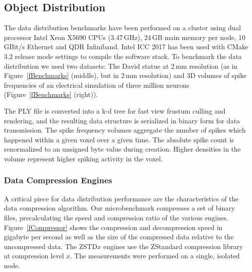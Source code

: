 \documentclass[10pt,journal,compsoc]{IEEEtran}
\newcommand{\fig}[1]{Figure~\ref{#1}}
\begin{document}
\subsection{Object Distribution}

The data distribution benchmarks have been performed on a cluster using dual
processor Intel Xeon X5690 CPUs (3.47\,GHz), 24\,GB main memory per node,
10\,GBit/s Ethernet and QDR Infiniband. Intel ICC 2017 has been used with CMake
3.2 release mode settings to compile the software stack. To benchmark the data
distribution we used two datasets: The David statue at 2\,mm resolution (as in
\fig{fBenchmarks} (middle), but in 2\,mm resolution) and 3D volumes of spike
frequencies of an electrical simulation of three million neurons
(\fig{fBenchmarks} (right)).

The PLY file is converted into a k-d tree for fast view frustum culling and
rendering, and the resulting data structure is serialized in binary form for
data transmission. The spike frequency volumes aggregate the number of spikes
which happened within a given voxel over a given time. The absolute spike count
is renormalized to an unsigned byte value during creation. Higher densities in
the volume represent higher spiking activity in the voxel.

\subsubsection{Data Compression Engines}

A critical piece for data distribution performance are the characteristics of
the data compression algorithm. Our microbenchmark compresses a set of binary
files, precalculating the speed and compression ratio of the various engines.
\fig{fCompressor} shows the compression and decompression speed in gigabyte per
second as well as the size of the compressed data relative to the uncompressed
data. The ZSTD$x$ engines use the ZStandard compression library at compression
level $x$. The measurements were performed on a single, isolated node.
\end{document}
